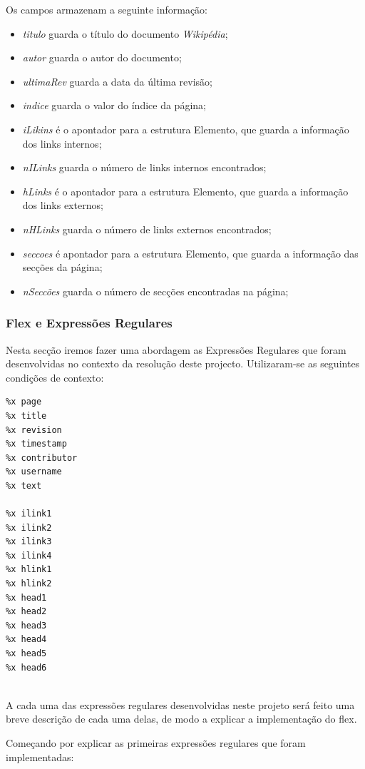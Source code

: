 \documentclass[11pt, a4paper, oneside]{article}
\begin{document}
Os campos armazenam a seguinte informação:
\begin{itemize}

\item \textit{titulo} guarda o título do documento \textit{Wikipédia};
\item \textit{autor} guarda o autor do documento;
\item \textit{ultimaRev} guarda a data da última revisão;
\item \textit{indice} guarda o valor do índice da página;
\item \textit{iLikins} é o apontador para a estrutura Elemento, que guarda a informação dos links internos;
\item \textit{nILinks} guarda o número de links internos encontrados;
\item \textit{hLinks} é o apontador para a estrutura Elemento, que guarda a informação dos links externos;
\item \textit{nHLinks} guarda o número de links externos encontrados;
\item \textit{seccoes} é apontador para a estrutura Elemento, que guarda a informação das secções da página;
\item \textit{nSeccões} guarda o número de secções encontradas na página;


\newpage
\end{itemize}
\subsubsection{Flex e Expressões Regulares}

Nesta secção iremos fazer uma abordagem as Expressões Regulares que foram desenvolvidas no contexto da resolução deste projecto. Utilizaram-se as seguintes condições de contexto:

\begin{verbatim}
%x page
%x title
%x revision
%x timestamp
%x contributor
%x username
%x text

%x ilink1
%x ilink2
%x ilink3
%x ilink4
%x hlink1
%x hlink2
%x head1
%x head2
%x head3
%x head4
%x head5
%x head6


\end{verbatim}

A cada uma das expressões regulares desenvolvidas neste projeto será feito uma breve descrição de cada uma delas, de modo a explicar a implementação do flex.

Começando por explicar as primeiras expressões regulares que foram implementadas: 
\end{document}
